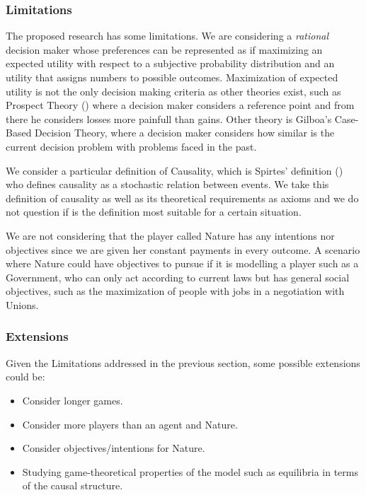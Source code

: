 \documentclass[english,letterpaper,12pt,final]{article}
\theoremstyle{definition}
\begin{document}
		\subsubsection{Limitations}
		The proposed research has some limitations. We are considering a \textit{rational} decision maker whose preferences can be represented as if maximizing an expected utility with respect to a subjective probability distribution and an utility that assigns numbers to possible outcomes. Maximization of expected utility is not the only decision making criteria as other theories exist, such as Prospect Theory (\cite{kahneman1979prospect}) where a decision maker considers a reference point and from there he considers losses more painfull than gains. Other theory is Gilboa's Case-Based Decision Theory, where a decision maker considers how similar is the current decision problem with problems faced in the past. 
		
		We consider a particular definition of Causality, which is Spirtes' definition (\cite{spirtes2000causation}) who defines causality as a stochastic relation between events. We take this definition of causality as well as its theoretical requirements as axioms and we do not question if is the definition most suitable for a certain situation.
		
		We are not considering that the player called Nature has any intentions nor objectives since we are given her constant payments in every outcome. A scenario where Nature could have objectives to pursue if it is modelling a player such as a Government, who can only act according to current laws but has general social objectives, such as the maximization of people with jobs in a negotiation with Unions.
		
		\subsubsection{Extensions}
		Given the Limitations addressed in the previous section, some possible extensions could be:
		\begin{itemize}
		\item Consider longer games.
		\item Consider more players than an agent and Nature.
		\item Consider objectives/intentions for Nature.
		\item Studying game-theoretical properties of the model such as equilibria in terms of the causal structure.
		\end{itemize}
\newpage
\end{document}
